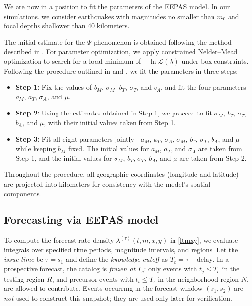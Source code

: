 \documentclass[linenum,doublespace,onecolumn]{SSA-SRL}
\theoremstyle{lemma}
\begin{document}
We are now in a position to fit the parameters of the EEPAS model. In our simulations, we consider earthquakes with magnitudes no smaller than $m_0$ and focal depths shallower than 40 kilometers.

The initial estimate for the $\Psi$ phenomenon is obtained following the method described in \cite{psi}. For parameter optimization, we apply constrained Nelder–Mead optimization to search for a local minimum of $-\ln \mathcal{L}(\lambda)$ under box constraints. Following the procedure outlined in \cite{2023ER} and \cite{RE}, we fit the parameters in three steps:

\begin{itemize}
    \item \textbf{Step 1:} Fix the values of $b_M$, $\sigma_M$, $b_T$, $\sigma_T$, and $b_A$, and fit the four parameters $a_M$, $a_T$, $\sigma_A$, and $\mu$.
    
    \item \textbf{Step 2:} Using the estimates obtained in Step 1, we proceed to fit $\sigma_M$, $b_T$, $\sigma_T$, $b_A$, and $\mu$, with their initial values taken from Step 1.
    
    \item \textbf{Step 3:} Fit all eight parameters jointly—$a_M$, $a_T$, $\sigma_A$, $\sigma_M$, $b_T$, $\sigma_T$, $b_A$, and $\mu$—while keeping $b_M$ fixed. The initial values for $a_M$, $a_T$, and $\sigma_A$ are taken from Step 1, and the initial values for $\sigma_M$, $b_T$, $\sigma_T$, $b_A$, and $\mu$ are taken from Step 2.
\end{itemize}

Throughout the procedure, all geographic coordinates (longitude and latitude) are projected into kilometers for consistency with the model’s spatial components.


\subsection{Forecasting via EEPAS model}

To compute the forecast rate density $\lambda^{(\tau)}(t, m, x, y)$ in \eqref{ltmxy}, we evaluate integrals over specified time periods, magnitude intervals, and regions. Let the \emph{issue time} be $\tau = s_1$ and define the \emph{knowledge cutoff} as $T_c = \tau - \mathrm{delay}$. In a prospective forecast, the catalog is \emph{frozen at $T_c$}: only events with $t_j \le T_c$ in the testing region $R$, and precursor events with $t_i \le T_c$ in the neighborhood region $N$, are allowed to contribute. Events occurring in the forecast window $(s_1, s_2)$ are \emph{not} used to construct this snapshot; they are used only later for verification.
\end{document}
